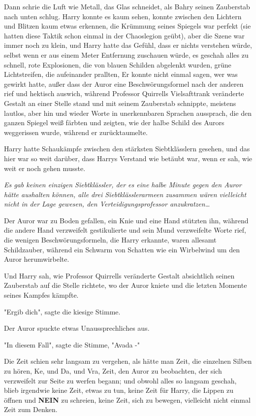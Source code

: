 {Dann schrie die Luft wie Metall, das Glas schneidet, als Bahry seinen Zauberstab nach unten schlug. Harry konnte es kaum sehen, konnte zwischen den Lichtern und Blitzen kaum etwas erkennen, die Krümmung seines Spiegels war perfekt (sie hatten diese Taktik schon einmal in der Chaoslegion geübt), aber die Szene war immer noch zu klein, und Harry hatte das Gefühl, dass er nichts verstehen würde, selbst wenn er aus einem Meter Entfernung zuschauen würde, es geschah alles zu schnell, rote Explosionen, die von blauen Schilden abgelenkt wurden, grüne Lichtstreifen, die aufeinander prallten, Er konnte nicht einmal sagen, wer was gewirkt hatte, außer dass der Auror eine Beschwörungsformel nach der anderen rief und hektisch auswich, während Professor Quirrells Vielsafttrank veränderte Gestalt an einer Stelle stand und mit seinem Zauberstab schnippte, meistens lautlos, aber hin und wieder Worte in unerkennbaren Sprachen aussprach, die den ganzen Spiegel weiß färbten und zeigten, wie der halbe Schild des Aurors weggerissen wurde, während er zurücktaumelte.

Harry hatte Schaukämpfe zwischen den stärksten Siebtklässlern gesehen, und das hier war so weit darüber, dass Harrys Verstand wie betäubt war, wenn er sah, wie weit er noch gehen musste.

\emph{Es gab keinen einzigen Siebtklässler, der es eine halbe Minute gegen den Auror hätte aushalten können, alle drei Siebtklässlerarmeen zusammen wären vielleicht nicht in der Lage gewesen, den Verteidigungsprofessor anzukratzen…}

Der Auror war zu Boden gefallen, ein Knie und eine Hand stützten ihn, während die andere Hand verzweifelt gestikulierte und sein Mund verzweifelte Worte rief, die wenigen Beschwörungsformeln, die Harry erkannte, waren allesamt Schildzauber, während ein Schwarm von Schatten wie ein Wirbelwind um den Auror herumwirbelte.

Und Harry sah, wie Professor Quirrells veränderte Gestalt absichtlich seinen Zauberstab auf die Stelle richtete, wo der Auror kniete und die letzten Momente seines Kampfes kämpfte.

"Ergib dich", sagte die kiesige Stimme.

Der Auror spuckte etwas Unaussprechliches aus.

"In diesem Fall", sagte die Stimme, "Avada -"

Die Zeit schien sehr langsam zu vergehen, als hätte man Zeit, die einzelnen Silben zu hören, Ke, und Da, und Vra, Zeit, den Auror zu beobachten, der sich verzweifelt zur Seite zu werfen begann; und obwohl alles so langsam geschah, blieb irgendwie keine Zeit, etwas zu tun, keine Zeit für Harry, die Lippen zu öffnen und \textbf{NEIN} zu schreien, keine Zeit, sich zu bewegen, vielleicht nicht einmal Zeit zum Denken.

}

